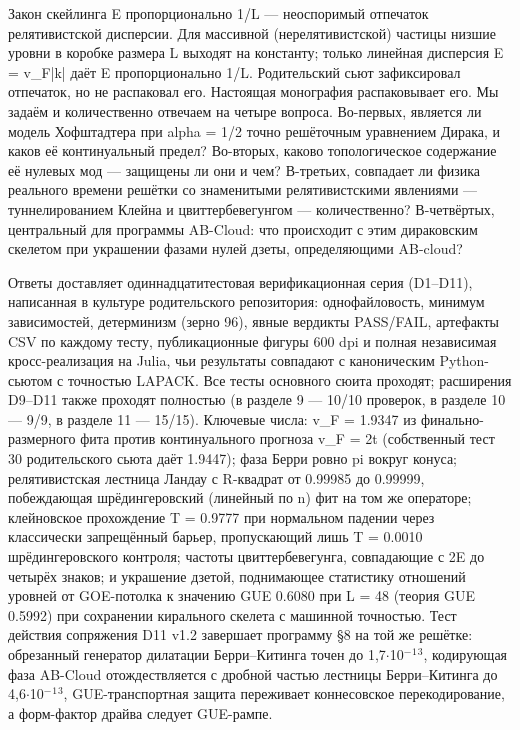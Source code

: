 \documentclass[11pt,a4paper]{article}
\begin{document}
Закон скейлинга E пропорционально 1/L --- неоспоримый отпечаток релятивистской дисперсии. Для массивной (нерелятивистской) частицы низшие уровни в коробке размера L выходят на константу; только линейная дисперсия E = v\_\allowbreak{}F|k| даёт E пропорционально 1/L. Родительский сьют зафиксировал отпечаток, но не распаковал его. Настоящая монография распаковывает его. Мы задаём и количественно отвечаем на четыре вопроса. Во-первых, является ли модель Хофштадтера при alpha = 1/2 точно решёточным уравнением Дирака, и каков её континуальный предел? Во-вторых, каково топологическое содержание её нулевых мод --- защищены ли они и чем? В-третьих, совпадает ли физика реального времени решётки со знаменитыми релятивистскими явлениями --- туннелированием Клейна и цвиттербевегунгом --- количественно? В-четвёртых, центральный для программы AB-Cloud: что происходит с этим дираковским скелетом при украшении фазами нулей дзеты, определяющими AB-cloud?

Ответы доставляет одиннадцатитестовая верификационная серия (D1--D11), написанная в культуре родительского репозитория: однофайловость, минимум зависимостей, детерминизм (зерно 96), явные вердикты PASS/FAIL, артефакты CSV по каждому тесту, публикационные фигуры 600 dpi и полная независимая кросс-реализация на Julia, чьи результаты совпадают с каноническим Python-сьютом с точностью LAPACK. Все тесты основного сюита проходят; расширения D9--D11 также проходят полностью (в разделе 9 --- 10/10 проверок, в разделе 10 --- 9/9, в разделе 11 --- 15/15). Ключевые числа: v\_\allowbreak{}F = 1.9347 из финально-размерного фита против континуального прогноза v\_\allowbreak{}F = 2t (собственный тест 30 родительского сьюта даёт 1.9447); фаза Берри ровно pi вокруг конуса; релятивистская лестница Ландау с R-квадрат от 0.99985 до 0.99999, побеждающая шрёдингеровский (линейный по n) фит на том же операторе; клейновское прохождение T = 0.9777 при нормальном падении через классически запрещённый барьер, пропускающий лишь T = 0.0010 шрёдингеровского контроля; частоты цвиттербевегунга, совпадающие с 2E до четырёх знаков; и украшение дзетой, поднимающее статистику отношений уровней от GOE-потолка к значению GUE 0.6080 при L = 48 (теория GUE 0.5992) при сохранении кирального скелета с машинной точностью. Тест действия сопряжения D11 v1.2 завершает программу \S{}8 на той же решётке: обрезанный генератор дилатации Берри--Китинга точен до 1,7$\cdot$10$^{-}$$^{1}$$^{3}$, кодирующая фаза AB-Cloud отождествляется с дробной частью лестницы Берри--Китинга до 4,6$\cdot$10$^{-}$$^{1}$$^{3}$, GUE-транспортная защита переживает коннесовское перекодирование, а форм-фактор драйва следует GUE-рампе.
\end{document}
